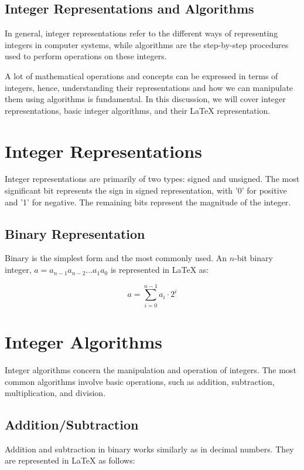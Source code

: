 \subsection{Integer Representations and Algorithms}
In general, integer representations refer to the different ways of representing integers in computer systems, while algorithms are the step-by-step procedures used to perform operations on these integers.

A lot of mathematical operations and concepts can be expressed in terms of integers, hence, understanding their representations and how we can manipulate them using algorithms is fundamental. In this discussion, we will cover integer representations, basic integer algorithms, and their LaTeX representation. 



\section{Integer Representations}

Integer representations are primarily of two types: signed and unsigned. The most significant bit represents the sign in signed representation, with '0' for positive and '1' for negative. The remaining bits represent the magnitude of the integer.

\subsection{Binary Representation}
Binary is the simplest form and the most commonly used. An $n$-bit binary integer, $a = a_{n-1}a_{n-2}\ldots a_{1}a_{0}$ is represented in LaTeX as:

\[
a = \sum_{i=0}^{n-1} a_i \cdot 2^i
\]

\section{Integer Algorithms}

Integer algorithms concern the manipulation and operation of integers. The most common algorithms involve basic operations, such as addition, subtraction, multiplication, and division. 

\subsection{Addition/Subtraction}
Addition and subtraction in binary works similarly as in decimal numbers. They are represented in LaTeX as follows:


